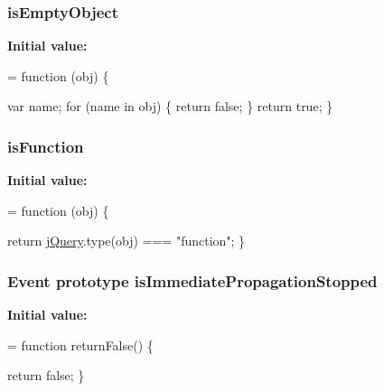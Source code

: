 \subsubsection[{\texorpdfstring{is\+Empty\+Object}{isEmptyObject}}]{ is\+Empty\+Object}\hypertarget{jquery-2_82_81-vsdoc_8js_aaf2bcef7602f40b9d2e1d70f197e44d1}{}\label{jquery-2_82_81-vsdoc_8js_aaf2bcef7602f40b9d2e1d70f197e44d1}
{\bfseries Initial value\+:}
\begin{DoxyCode}
= \textcolor{keyword}{function} (obj) \{
        

        var name;
        \textcolor{keywordflow}{for} (name in obj) \{
            \textcolor{keywordflow}{return} \textcolor{keyword}{false};
        \}
        \textcolor{keywordflow}{return} \textcolor{keyword}{true};
    \}
\end{DoxyCode}
\subsubsection[{\texorpdfstring{is\+Function}{isFunction}}]{ is\+Function}\hypertarget{jquery-2_82_81-vsdoc_8js_a02aa8413df0c687cbb1cd77943741d5a}{}\label{jquery-2_82_81-vsdoc_8js_a02aa8413df0c687cbb1cd77943741d5a}
{\bfseries Initial value\+:}
\begin{DoxyCode}
= \textcolor{keyword}{function} (obj) \{
        

        \textcolor{keywordflow}{return} \hyperlink{jquery-2_82_81-vsdoc_8js_add5237586d970a38a81f990e8eb28c6c}{jQuery}.type(obj) === \textcolor{stringliteral}{"function"};
    \}
\end{DoxyCode}
\subsubsection[{\texorpdfstring{is\+Immediate\+Propagation\+Stopped}{isImmediatePropagationStopped}}]{ {\bf Event} {\bf prototype} is\+Immediate\+Propagation\+Stopped}\hypertarget{jquery-2_82_81-vsdoc_8js_a5fe8157d3a55c7b444e8d97b9dcde6a8}{}\label{jquery-2_82_81-vsdoc_8js_a5fe8157d3a55c7b444e8d97b9dcde6a8}
{\bfseries Initial value\+:}
\begin{DoxyCode}
= \textcolor{keyword}{function} returnFalse() \{
        

        \textcolor{keywordflow}{return} \textcolor{keyword}{false};
    \}
\end{DoxyCode}
